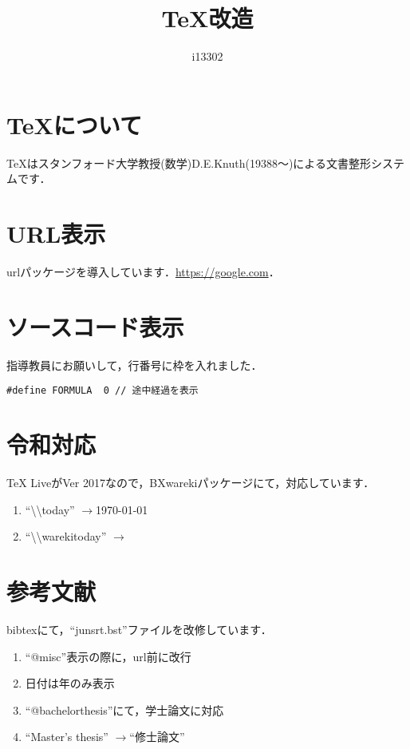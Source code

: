 \documentclass[twocolumn,10pt]{jarticle}
\title{\TeX 改造}
\author{i13302}
\date{\warekitoday}
\newcommand{\zr}{$\rightarrow$}
\begin{document}
 
\maketitle 
\section{\TeX について}
TeXはスタンフォード大学教授(数学)D.E.Knuth(19388～)による文書整形システムです\cite{TeX入門}．

\section{URL表示}
urlパッケージを導入しています．\url{https://google.com}．

\section{ソースコード表示}
指導教員にお願いして，行番号に枠を入れました．

\begin{lstlisting}[caption=FORMURAの定義]
#define FORMULA  0 // 途中経過を表示
\end{lstlisting}



\section{令和対応}
TeX LiveがVer 2017なので，BXwarekiパッケージ\cite{bxwareki}にて，対応しています．

\begin{enumerate}
	\item ``\textbackslash\textbackslash  today'' \zr \today
	\item ``\textbackslash\textbackslash warekitoday'' \zr \warekitoday
\end{enumerate}

\section{参考文献}
bibtexにて，``junsrt.bst''ファイルを改修しています．
\begin{enumerate}
	\item ``@misc''表示の際に，url前に改行
	\item 日付は年のみ表示
	\item ``@bachelorthesis''にて，学士論文に対応
	\item ``Master's thesis'' \zr ``修士論文''
\end{enumerate}





\end{document}
